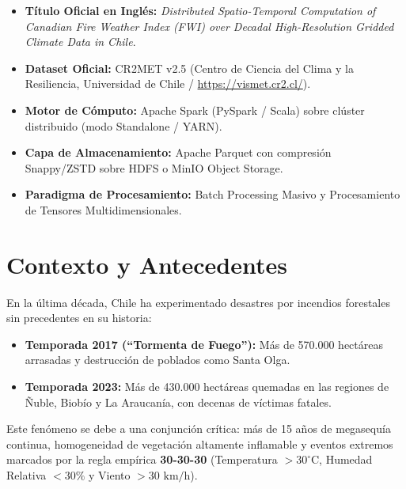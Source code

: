 \documentclass[11pt,a4paper]{article}
\begin{document}
\begin{itemize}[leftmargin=5mm]
    \item \textbf{Título Oficial en Inglés:} \textit{Distributed Spatio-Temporal Computation of Canadian Fire Weather Index (FWI) over Decadal High-Resolution Gridded Climate Data in Chile}.
    \item \textbf{Dataset Oficial:} CR2MET v2.5 (Centro de Ciencia del Clima y la Resiliencia, Universidad de Chile / \url{https://vismet.cr2.cl/}).
    \item \textbf{Motor de Cómputo:} Apache Spark (PySpark / Scala) sobre clúster distribuido (modo Standalone / YARN).
    \item \textbf{Capa de Almacenamiento:} Apache Parquet con compresión Snappy/ZSTD sobre HDFS o MinIO Object Storage.
    \item \textbf{Paradigma de Procesamiento:} Batch Processing Masivo y Procesamiento de Tensores Multidimensionales.
\end{itemize}

\section{Contexto y Antecedentes}

En la última década, Chile ha experimentado desastres por incendios forestales sin precedentes en su historia:
\begin{itemize}[leftmargin=5mm]
    \item \textbf{Temporada 2017 (``Tormenta de Fuego''):} Más de 570.000 hectáreas arrasadas y destrucción de poblados como Santa Olga.
    \item \textbf{Temporada 2023:} Más de 430.000 hectáreas quemadas en las regiones de Ñuble, Biobío y La Araucanía, con decenas de víctimas fatales.
\end{itemize}

Este fenómeno se debe a una conjunción crítica: más de 15 años de megasequía continua, homogeneidad de vegetación altamente inflamable y eventos extremos marcados por la regla empírica \textbf{30-30-30} (Temperatura $>30^\circ\text{C}$, Humedad Relativa $<30\%$ y Viento $>30\text{ km/h}$).
\end{document}
